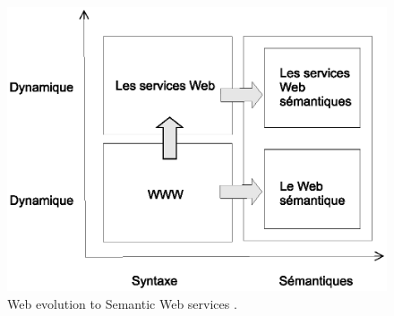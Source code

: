 \begin{figure}[h]
    \centering
    \includegraphics[width=1\textwidth]{figs/3w_to_sws.eps}
    \caption{Web evolution to Semantic Web services \cite{fensel2002semantic}.}
    \label{fig:3w_to_sws}
\end{figure}

